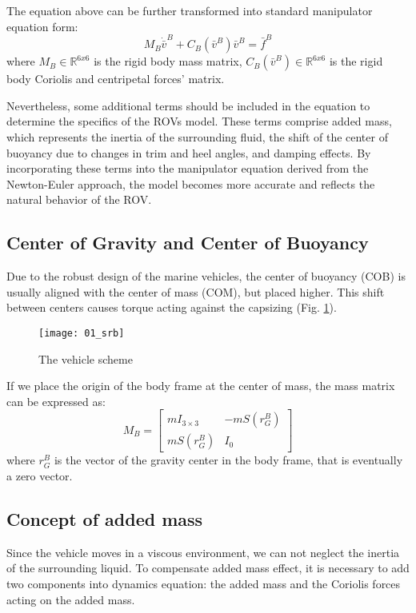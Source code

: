    The equation above can be further transformed into standard manipulator equation form:
    $$
     M_B \dot{\bar{v}}^B+C_B(\bar{v}^B) \bar{v}^B
    = \bar{f}^B
    $$
    where
    $M_B \in \mathbb{R}^{6 x 6}$ is the rigid body mass matrix,
    $C_B(\bar{v}^B) \in \mathbb{R}^{6 x 6}$ is the rigid body Coriolis and centripetal forces' matrix.

    Nevertheless, some additional terms should be included in the equation to determine the specifics of the ROVs model. 
    These terms comprise added mass, which represents the inertia of the surrounding fluid, the shift of the 
    center of buoyancy due to changes in trim and heel angles, and damping effects. 
    By incorporating these terms into the manipulator equation derived from the Newton-Euler approach, 
    the model becomes more accurate and reflects the natural behavior of the ROV.    

\subsection{Center of Gravity and Center of Buoyancy}
    
    Due to the robust design of the marine vehicles, the center of buoyancy (COB) is usually aligned with
    the center of mass (COM), but placed higher.
    This shift between centers causes torque acting against the capsizing (Fig. \ref{image:scheme}).
    \begin{figure}[H]
        \centering\texttt{[image: 01\_srb]}
        \caption{The vehicle scheme}
        \label{image:scheme}
    \end{figure}
    
    If we place the origin of the body frame at the center of mass, the mass matrix can be expressed as:
    $$
    M_B=\left[\begin{array}{cc}
        m I_{3 \times 3} & -m S\left(r_G^B\right) \\
        m S\left(r_G^B\right) & I_0
    \end{array}\right]
    $$
    where $r_G^B$ is the vector of the gravity center in the body frame, that is eventually a zero vector.

\subsection{Concept of added mass}

    Since the vehicle moves in a viscous environment, we can not neglect the inertia of the surrounding liquid.
    To compensate added mass effect, it is necessary to add two components into dynamics equation: 
    the added mass and the Coriolis forces acting on the added mass.

